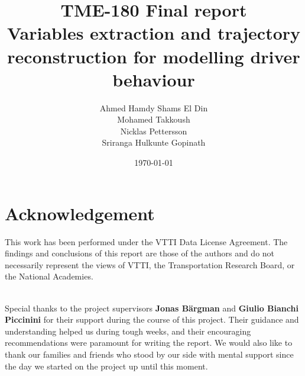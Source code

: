 \documentclass[a4paper]{article}
\begin{document}

\newcommand\mTitle{\textbf{}}
\newcommand\mNumber{}
\newcommand\mLocation{}
\newcommand\mDate{}
\newcommand\mDuration{}
\newcommand\mAttendies{}
\newcommand\mMinuteTaker{}
\newcommand\mDiscussion{}
\newcommand\mFuturePlans{}
\newcommand\mDeadlines{}

\title{TME-180 Final report\\ 
\textbf{Variables extraction and trajectory reconstruction for
modelling driver behaviour}}
\author{\textbf\large{Ahmed Hamdy Shams El Din}\\
        \textbf\large{Mohamed Takkoush}\\
        \textbf\large{Nicklas Pettersson}\\
        \textbf\large{Sriranga Hulkunte Gopinath}}
\date{\today}
\maketitle
\begin{abstract}

\end{abstract}%
\newpage
\section*{Acknowledgement}

\noindent
This work has been performed under the VTTI Data License Agreement. The findings and conclusions of this report are those of the authors and do not necessarily represent the views of VTTI, the Transportation Research Board, or the National Academies.
\noindent

\noindent
\\
Special thanks to the project supervisors \textbf{Jonas Bärgman} and \textbf{Giulio Bianchi Piccinini} for their support during the course of this project. Their guidance and understanding helped us during tough weeks, and their encouraging recommendations were paramount for writing the report. We would also like to thank our families and friends who stood by our side with mental support since the day we started on the project up until this moment.
\end{document}
